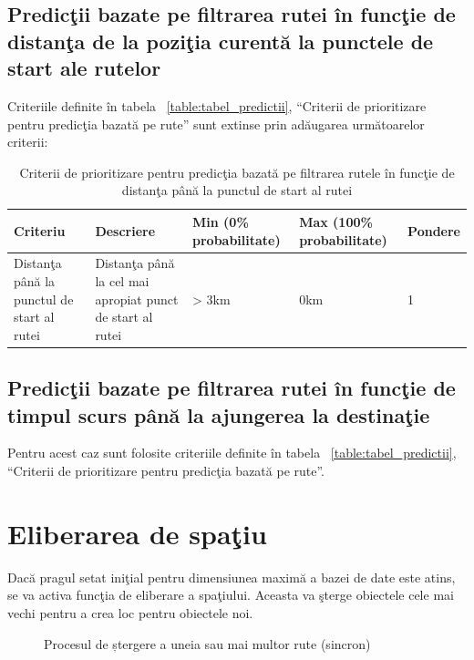 		
		\subsection{Predicţii bazate pe filtrarea rutei în funcţie de distanţa de la poziţia curentă la punctele de start ale rutelor}
		Criteriile definite în tabela ~\ref{table:tabel_predictii}, ``Criterii de prioritizare pentru predicţia bazată pe rute'' sunt extinse prin adăugarea următoarelor criterii:
		
		\begin{table}[!h]
		\caption{Criterii de prioritizare pentru predicţia bazată pe filtrarea rutele în funcţie de distanţa până la punctul de start al rutei}
		\centering
		\begin{tabular}{ | m{} | m{} | m{3,22cm} | m{} | m{} | }
		\hline
		\textbf{Criteriu} & \textbf{Descriere} & \textbf{Min (0\% probabilitate)} & \textbf{Max (100\% probabilitate)} & \textbf{Pondere} \\ 
		\hline
		 Distanţa până la punctul de start al rutei & Distanţa până la cel mai apropiat punct de start al rutei &> 3km & 0km & 1 \\
		\hline
		\end{tabular}
		\end{table}
		
		\subsection{Predicţii bazate pe filtrarea rutei în funcţie de timpul scurs până la ajungerea la destinaţie}
		Pentru acest caz sunt folosite criteriile definite în tabela ~\ref{table:tabel_predictii}, ``Criterii de prioritizare pentru predicţia bazată pe rute''.
		
	
\section{Eliberarea de spaţiu}   
Dacă pragul setat iniţial pentru dimensiunea maximă a bazei de date este atins, se va activa funcţia de eliberare a spaţiului. Aceasta va şterge obiectele cele mai vechi pentru a crea loc pentru obiectele noi.

	\begin{figure}[h!]
   \centering
   \caption{Procesul de ștergere a uneia sau mai multor rute (sincron)}
   \end{figure}	

		
		
		
		


	